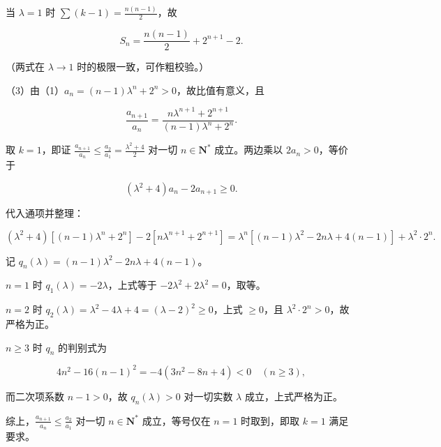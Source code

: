 \begin{answer}
当 $\lambda=1$ 时 $\sum(k-1)=\frac{n(n-1)}2$，故

\nopagebreak[4]
\[S_n=\frac{n(n-1)}2+2^{n+1}-2 .\]

（两式在 $\lambda\to1$ 时的极限一致，可作粗校验。）

（3）由（1）$a_n=(n-1)\lambda^n+2^n>0$，故比值有意义，且

\nopagebreak[4]
\[\frac{a_{n+1}}{a_n}=\frac{n\lambda^{n+1}+2^{n+1}}{(n-1)\lambda^n+2^n} .\]

取 $k=1$，即证 $\frac{a_{n+1}}{a_n}\le\frac{a_2}{a_1}=\frac{\lambda^2+4}2$ 对一切 $n\in\mathbf N^*$ 成立。两边乘以 $2a_n>0$，等价于

\nopagebreak[4]
\[\left(\lambda^2+4\right)a_n-2a_{n+1}\ge0 .\]

代入通项并整理：

\nopagebreak[4]
\[\left(\lambda^2+4\right)\left[(n-1)\lambda^n+2^n\right]-2\left[n\lambda^{n+1}+2^{n+1}\right]
=\lambda^n\left[(n-1)\lambda^2-2n\lambda+4(n-1)\right]+\lambda^2\cdot2^n .\]

记 $q_n(\lambda)=(n-1)\lambda^2-2n\lambda+4(n-1)$。

$n=1$ 时 $q_1(\lambda)=-2\lambda$，上式等于 $-2\lambda^2+2\lambda^2=0$，取等。

$n=2$ 时 $q_2(\lambda)=\lambda^2-4\lambda+4=(\lambda-2)^2\ge0$，上式 $\ge0$，且 $\lambda^2\cdot2^n>0$，故严格为正。

$n\ge3$ 时 $q_n$ 的判别式为

\nopagebreak[4]
\[4n^2-16(n-1)^2=-4\left(3n^2-8n+4\right)<0\quad(n\ge3),\]

而二次项系数 $n-1>0$，故 $q_n(\lambda)>0$ 对一切实数 $\lambda$ 成立，上式严格为正。

综上，$\frac{a_{n+1}}{a_n}\le\frac{a_2}{a_1}$ 对一切 $n\in\mathbf N^*$ 成立，等号仅在 $n=1$ 时取到，即取 $k=1$ 满足要求。


\end{answer}
